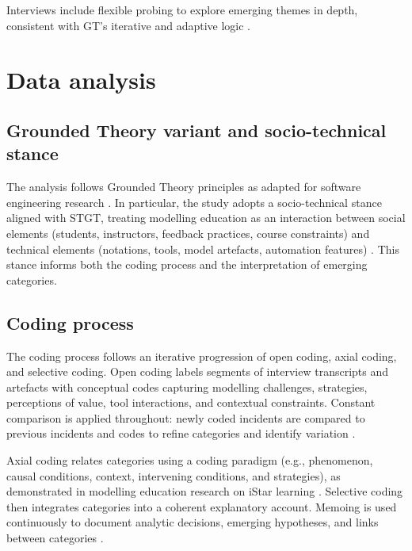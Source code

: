 Interviews include flexible probing to explore emerging themes in depth, consistent with GT's iterative and adaptive logic \cite{adolph2011using,stol2016grounded}.


\section{Data analysis}
\label{sec:method_analysis}

\subsection{Grounded Theory variant and socio-technical stance}
\label{subsec:method_gt_variant}

The analysis follows Grounded Theory principles as adapted for software engineering research \cite{adolph2011using,stol2016grounded}. In particular, the study adopts a socio-technical stance aligned with STGT, treating modelling education as an interaction between social elements (students, instructors, feedback practices, course constraints) and technical elements (notations, tools, model artefacts, automation features) \cite{hoda2018socio}. This stance informs both the coding process and the interpretation of emerging categories.

\subsection{Coding process}
\label{subsec:method_coding}

The coding process follows an iterative progression of open coding, axial coding, and selective coding. Open coding labels segments of interview transcripts and artefacts with conceptual codes capturing modelling challenges, strategies, perceptions of value, tool interactions, and contextual constraints. Constant comparison is applied throughout: newly coded incidents are compared to previous incidents and codes to refine categories and identify variation \cite{adolph2011using}.

Axial coding relates categories using a coding paradigm (e.g., phenomenon, causal conditions, context, intervening conditions, and strategies), as demonstrated in modelling education research on iStar learning \cite{istar-learning}. Selective coding then integrates categories into a coherent explanatory account. Memoing is used continuously to document analytic decisions, emerging hypotheses, and links between categories \cite{adolph2011using,stol2016grounded}.

